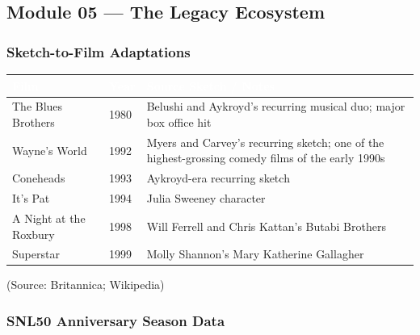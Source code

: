 \documentclass[11pt,letterpaper]{article}
\newcommand{\tableheader}[1]{\textbf{\sffamily\textcolor{white}{#1}}}
\begin{document}
\subsection{Module 05 --- The Legacy Ecosystem}

\subsubsection{Sketch-to-Film Adaptations}

\begin{center}
\begin{tabularx}{\textwidth}{L{3.5cm}C{1.5cm}X}
\toprule
{}
\tableheader{Film} & \tableheader{Year} & \tableheader{Source Sketch / Notes} \\
\midrule
The Blues Brothers & 1980 & Belushi and Aykroyd's recurring musical duo; major box office hit \\
Wayne's World & 1992 & Myers and Carvey's recurring sketch; one of the highest-grossing comedy films of the early 1990s \\
Coneheads & 1993 & Aykroyd-era recurring sketch \\
It's Pat & 1994 & Julia Sweeney character \\
A Night at the Roxbury & 1998 & Will Ferrell and Chris Kattan's Butabi Brothers \\
Superstar & 1999 & Molly Shannon's Mary Katherine Gallagher \\
\bottomrule
\end{tabularx}
\end{center}

(Source: Britannica; Wikipedia)

\subsubsection{SNL50 Anniversary Season Data}
\end{document}
